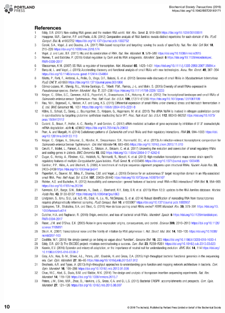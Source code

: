 \begin{figure}
    \centering
    \includegraphics[width=\linewidth]{lit_review/page10.png}
\end{figure}

